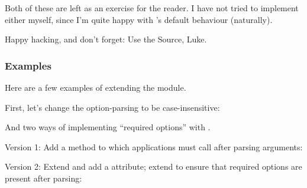 Both of these are left as an exercise for the reader.  I have not
tried to implement either myself, since I'm quite happy with
's default behaviour (naturally).

Happy hacking, and don't forget: Use the Source, Luke.

\subsubsection{Examples\label{optparse-extending-examples}}

Here are a few examples of extending the  module.

First, let's change the option-parsing to be case-insensitive:



And two ways of implementing ``required options'' with
.

Version 1: Add a method to  which applications
must call after parsing arguments:



Version 2: Extend  and add a 
attribute; extend  to ensure that required options
are present after parsing:



\begin{seealso}
\end{seealso}
